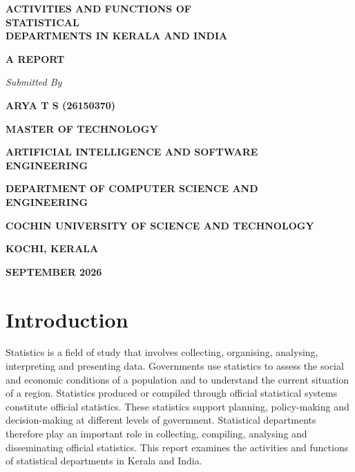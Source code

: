 \documentclass[12pt,a4paper]{article}
\begin{document}
\begin{titlepage}
\centering

\vspace*{1.5cm}

{\Large\textbf{ACTIVITIES AND FUNCTIONS OF}}\\[0.35cm] {\Large\textbf{STATISTICAL}}\\[0.35cm]
{\Large\textbf{DEPARTMENTS IN KERALA AND INDIA}}

\vspace{1.8cm}

{\large\textbf{A REPORT}}

\vspace{1.5cm}

{\Large\textit{Submitted By}}

\vspace{1.5cm}

{\large\textbf{ARYA T S (26150370)}}

\vspace{1.5cm}

{\large\textbf{MASTER OF TECHNOLOGY}}

\vspace{0.35cm}

{\large\textbf{ARTIFICIAL INTELLIGENCE AND SOFTWARE}}\\[0.35cm]{\Large\textbf{ENGINEERING}}

\vspace{1.5cm}

{\large\textbf{DEPARTMENT OF COMPUTER SCIENCE AND}}\\[0.35cm]{\large\textbf{ENGINEERING}}

\vspace{1.5cm}

{\large\textbf{COCHIN UNIVERSITY OF SCIENCE AND TECHNOLOGY}}

\vspace{0.35cm}

{\large\textbf{KOCHI, KERALA}}

\vspace{0.35cm}

{\large\textbf{SEPTEMBER 2026}}

\end{titlepage}

\section{Introduction}

Statistics is a field of study that involves collecting, organising, analysing, interpreting and presenting data. Governments use statistics to assess the social and economic conditions of a population and to understand the current situation of a region. Statistics produced or compiled through official statistical systems constitute official statistics. These statistics support planning, policy-making and decision-making at different levels of government. Statistical departments therefore play an important role in collecting, compiling, analysing and disseminating official statistics. This report examines the activities and functions of statistical departments in Kerala and India.
\end{document}
